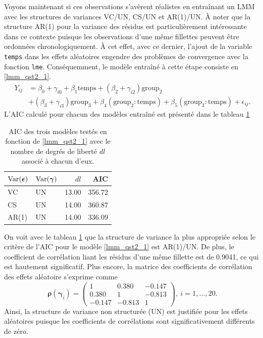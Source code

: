 \documentclass{article}
\begin{document}
		Voyons maintenant si ces observations s'avèrent réalistes en entraînant un LMM avec les structures de variances VC/UN, CS/UN et AR(1)/UN. À noter que la structure AR(1) pour la variance des résidus est particulièrement intéressante dans ce contexte puisque les observations d'une même fillettes peuvent être ordonnées chronologiquement.
		À cet effet, avec ce dernier, l'ajout de la variable \texttt{temps} dans les effets aléatoires engendre des problèmes de convergence avec la fonction \texttt{lme}. Conséquemment, le modèle entraîné à cette étape consiste en \eqref{lmm_qst2_1}.
		\begin{align}\label{lmm_qst2_1}
			Y_{ij} &= \beta_0 + \gamma_{i0} + \beta_1 \mathrm{temps} + (\beta_2 + \gamma_{i2}) \mathrm{group_2} \\
			&+ (\beta_3 + \gamma_{i3}) \mathrm{group_3} + \beta_4 (\mathrm{group_2:temps}) + \beta_5 (\mathrm{group_3:temps}) + \epsilon_{ij}. \nonumber
		\end{align}
		L'AIC calculé pour chacun des modèles entraîné est présenté dans le tableau \ref{tbl_AIC_Qst2}
		\begin{table}[H]
			\centering
			\begin{tabular}{ll|rr}
				\hline
				$\mathrm{Var}(\boldsymbol{\epsilon})$ & $\mathrm{Var}(\boldsymbol{\gamma})$ & $dl$ & AIC \\ 
				\hline
				VC & UN & 13.00 & 356.72 \\ 
				CS & UN & 14.00 & 360.87 \\ 
				AR(1) & UN & 14.00 & 336.09 \\ 
				\hline
			\end{tabular}
			\caption{AIC des trois modèles testés en fonction de \eqref{lmm_qst2_1} avec le nombre de degrés de liberté $dl$ associé à chacun d'eux.}
			\label{tbl_AIC_Qst2}
		\end{table}
	On voit avec le tableau \ref{tbl_AIC_Qst2} que la structure de variance la plus appropriée selon le critère de l'AIC pour le modèle \eqref{lmm_qst2_1} est AR(1)/UN. De plus, le coefficient de corrélation liant les résidus d'une même fillette est de 0.9041, ce qui est hautement significatif. Plus encore, la matrice des coefficients de corrélation des effets aléatoire s'exprime comme
	$$
		\boldsymbol{\rho}(\boldsymbol{\gamma}_i) = 
		\begin{pmatrix}
			1 & 0.380 & -0.147 \\
			0.380 & 1 & -0.813 \\
			-0.147 & -0.813 & 1
		\end{pmatrix},\ i=1,\dots, 20.
	$$
	Ainsi, la structure de variance non structurée (UN) est justifiée pour les effets aléatoires puisque les coefficients de corrélations sont significativement différents de zéro.\\
	
\end{document}
